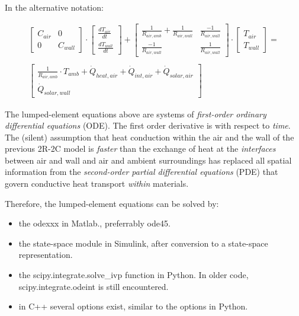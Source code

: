 In the alternative notation:

\begin{equation}
	\begin{aligned}
	\begin{bmatrix}
	    C_{air} & 0 \\
	    0 &  C_{wall}
    \end{bmatrix}
    \cdot
    \begin{bmatrix}
    	\frac{dT_{air}}{dt} \\
    	\frac{dT_{wall}}{dt}
    \end{bmatrix}
    +
    	\begin{bmatrix}
    	\frac{1}{R_{air, amb}} + \frac{1}{R_{air, wall}} & \frac{-1}{R_{air, wall}} \\
    	\frac{-1}{R_{air, wall}} &  \frac{1}{R_{air, wall}}
    \end{bmatrix}
    \cdot
    \begin{bmatrix}
    	T_{air} \\
    	T_{wall}
    \end{bmatrix}
    = \\ \\
    \begin{bmatrix}
        \frac{1}{R_{air, amb}} \cdot T_{amb} + \dot{Q}_{heat, air} + \dot{Q}_{int, air} + \dot{Q}_{solar, air} \\
    	\dot{Q}_{solar, wall}
    \end{bmatrix}
	\end{aligned}
\end{equation}

The lumped-element equations above are systems of \emph{first-order ordinary differential equations} (ODE). The first order derivative is with respect to \emph{time}. The (silent) assumption that heat conduction within the air and the wall of the previous 2R-2C model is \emph{faster} than the exchange of heat at the \emph{interfaces} between air and wall and air and ambient surroundings has replaced all spatial information from the \emph{second-order partial differential equations} (PDE) that govern conductive heat transport \emph{within} materials.

Therefore, the lumped-element equations can be solved by:
\begin{itemize}
	\item the \textsf{odexxx} in Matlab., preferrably \textsf{ode45}.
	\item the \textsf{state-space} module in Simulink, after conversion to a state-space representation.
	\item the \textsf{scipy.integrate.solve\_ivp} function in Python. In older code, \textsf{scipy.integrate.odeint} is still encountered.
	\item in C++ several options exist, similar to the options in Python.
\end{itemize}

